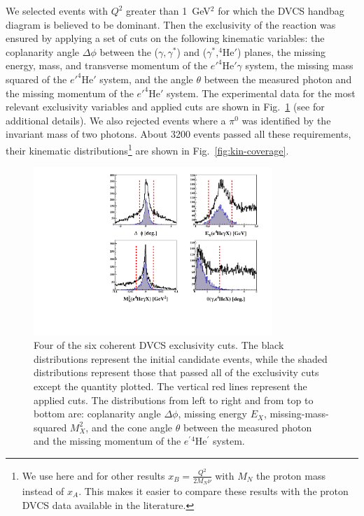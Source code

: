 \documentclass[twocolumn,nofootinbib,showpacs,prl,superscriptaddress,secnumarabic,amssymb,nobibnotes,aps,floatfix]{revtex4}
\begin{document}
We selected events with $Q^{2}$ greater than 1~GeV$^{2}$ for which the DVCS handbag 
diagram is believed to be dominant. Then the exclusivity of the reaction was ensured by 
applying a set of cuts on the following kinematic variables: the coplanarity 
angle $\Delta\phi$ between the ($\gamma,\gamma^*$) 
and ($\gamma^*$,$^4$He$'$) planes, the missing energy, mass, and transverse
momentum of the $e'^4$He$'\gamma$ system, the missing mass squared of 
the $e'^4$He$'$ system, and the angle $\theta$
between the measured photon and the missing momentum of the $e'^4$He$'$ system.  
The experimental data for the most relevant exclusivity variables and applied
cuts are shown in Fig.~\ref{fig:kin-cuts} (see \cite{Hattawy:thesis} for 
additional details). We also 
rejected events where a $\pi^0$ was identified by the invariant mass of 
two photons. About 3200 events passed all these requirements, their kinematic 
distributions\footnote{We use here and for other results 
$x_B =\frac{Q^2}{2M_N\nu}$ with $M_N$ the proton mass instead of $x_A$.
This makes it easier to compare these results with the proton DVCS data
available in the literature.} are shown in Fig.~\ref{fig:kin-coverage}.

\begin{figure}[tb]
\centering
\hspace{-0.45cm}
\includegraphics[width=9cm]{F_all_coh_exc_cuts-pub.pdf}
\caption{Four of the six coherent DVCS exclusivity cuts. The black 
distributions represent the initial candidate events, while the shaded 
distributions represent those that passed all of the exclusivity cuts except 
the quantity plotted. The vertical red lines represent the applied cuts.
The distributions from left to right and from top to bottom are: coplanarity 
angle $\Delta \phi$, missing energy $E_X$, missing-mass-squared $M_X^2$, and 
the cone angle $\theta$ between the measured photon and the missing momentum 
of the $e^\prime{^4}$He$^\prime$ system.}
\label{fig:kin-cuts}
\end{figure}
 
\end{document}
